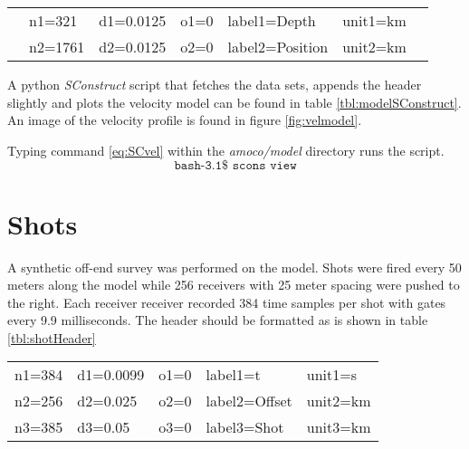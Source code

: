 \begin{center}
{
\begin{tabular}[t]{|clllllc|}
        \hline
          &  n1=321   &      d1=0.0125    &   o1=0        &       label1=Depth  &       unit1=km &  \\
          &  n2=1761  &      d2=0.0125    &   o2=0        &       label2=Position &     unit2=km &  \\
        \hline
\end{tabular}
}
\end{center}

A python \emph{SConstruct} script that fetches the data sets, appends the header slightly and plots the velocity model can be found in table \ref{tbl:modelSConstruct}.  An image of the velocity profile is found in figure \ref{fig:velmodel}. 

{
\tiny

\normalsize
}

Typing command \ref{eq:SCvel} within the \emph{amoco\slash model} directory runs the script.
\begin{equation}\label{eq:SCvel} \texttt{bash-3.1\$\ scons\ view} \end{equation}


\section{Shots}
A synthetic off-end survey was performed on the model.  Shots were fired every 50 meters along the model while 256 receivers with 25 meter spacing were pushed to the right.  Each receiver receiver recorded 384 time samples per shot with gates every 9.9 milliseconds.  The header should be formatted as is shown in table \ref{tbl:shotHeader} 

{
\begin{tabular}[frame=single]{|lllll|}
        \hline
    n1=384  &       d1=0.0099  &    o1=0  &        label1=t       &   unit1=s  \\
    n2=256  &       d2=0.025   &    o2=0  &        label2=Offset  &   unit2=km   \\
    n3=385  &       d3=0.05    &    o3=0  &        label3=Shot    &   unit3=km   \\
        \hline
\end{tabular}
}

